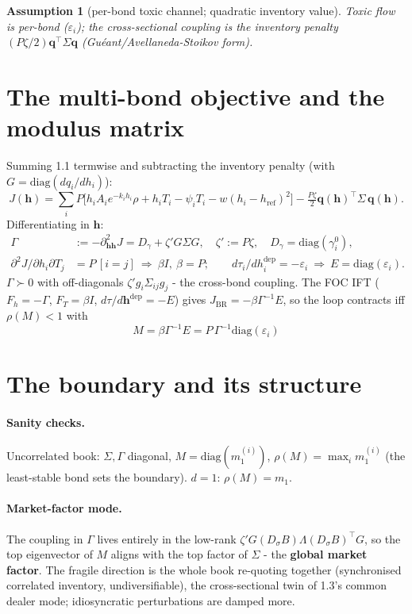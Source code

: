 \documentclass[11pt]{article}
\newtheorem{assumption}{Assumption}
\newcommand{\eps}{\varepsilon}
\newcommand{\BR}{\mathrm{BR}}
\newcommand{\Gam}{\Gamma}
\newcommand{\Sig}{\Sigma}
\newcommand{\Mmat}{M}
\newcommand{\diag}{\mathrm{diag}}
\newcommand{\bh}{\bm{h}}
\newcommand{\bq}{\bm{q}}
\begin{document}
\begin{assumption}[per-bond toxic channel; quadratic inventory value]
Toxic flow is per-bond ($\eps_i$); the cross-sectional coupling is the inventory
penalty $(P\zeta/2)\bq^{\!\top}\Sig\bq$ (Gu\'eant/Avellaneda-Stoikov form).
\end{assumption}

\section{The multi-bond objective and the modulus matrix}

Summing 1.1 termwise and subtracting the inventory penalty (with $G=\diag(dq_i/dh_i)$):
%
\[
  J(\bh)=\sum_i P\big[h_iA_ie^{-k_ih_i}\rho+h_iT_i-\psi_iT_i-w(h_i-h_{\mathrm{ref}})^2\big]
  -\tfrac{P\zeta}{2}\bq(\bh)^{\!\top}\Sig\,\bq(\bh).
\]
%
Differentiating in $\bh$:
%
\begin{align*}
  \Gam &:= -\partial^2_{\bh\bh}J = D_\gamma + \zeta' G\Sig G,\quad \zeta':=P\zeta,\quad
  D_\gamma=\diag(\gamma_i^0),\\
  \partial^2 J/\partial h_i\partial T_j &= P\,[i{=}j]\ \Rightarrow\ \beta I,\ \beta=P;\qquad
  d\tau_i/dh_i^{\mathrm{dep}}=-\eps_i\ \Rightarrow\ E=\diag(\eps_i).
\end{align*}
%
$\Gam\succ0$ with off-diagonals $\zeta' g_i\Sig_{ij}g_j$ - the cross-bond coupling.
The FOC IFT ($F_h=-\Gam$, $F_T=\beta I$, $d\tau/d\bh^{\mathrm{dep}}=-E$) gives
$J_{\BR}=-\beta\Gam^{-1}E$, so the loop contracts iff $\rho(\Mmat)<1$ with
%
\begin{equation}
  \boxed{\;\Mmat=\beta\Gam^{-1}E=P\,\Gam^{-1}\diag(\eps_i)\;}
\end{equation}

\section{The boundary and its structure}

\paragraph{Sanity checks.}
Uncorrelated book: $\Sig,\Gam$ diagonal, $\Mmat=\diag(m_1^{(i)})$,
$\rho(\Mmat)=\max_i m_1^{(i)}$ (the least-stable bond sets the boundary).
$d=1$: $\rho(\Mmat)=m_1$. \checkmark

\paragraph{Market-factor mode.}
The coupling in $\Gam$ lives entirely in the low-rank $\zeta'G(D_\sigma B)\Lambda(D_\sigma B)^{\!\top}G$,
so the top eigenvector of $\Mmat$ aligns with the top factor of $\Sig$ - the
\textbf{global market factor}. The fragile direction is the whole book re-quoting
together (synchronised correlated inventory, undiversifiable), the cross-sectional
twin of 1.3's common dealer mode; idiosyncratic perturbations are damped more.
\end{document}
